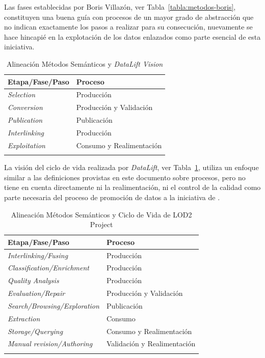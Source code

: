 Las fases establecidas por Boris Villazón, ver Tabla~\ref{tabla:metodos-boris}, constituyen una buena guía con procesos
de un mayor grado de abstracción que no indican exactamente los pasos a realizar para su consecución, nuevamente se
hace hincapié en la explotación de los datos enlazados como parte esencial de esta iniciativa.

\begin{longtable}[c]{|p{6cm}|p{8cm}|} 

\hline

  \textbf{Etapa/Fase/Paso} &  \textbf{Proceso} \\\hline

\endhead
\textit{Selection} & Producción \\ \hline
\textit{Conversion} & Producción y Validación \\ \hline
\textit{Publication} & Publicación \\ \hline
\textit{Interlinking} & Producción \\ \hline
\textit{Exploitation} & Consumo y Realimentación \\ \hline
\hline
\caption{Alineación Métodos Semánticos y \textit{DataLift Vision}}  \label{tabla:metodos-data-lift}\\    
\end{longtable}

La visión del ciclo de vida realizada por \textit{DataLift}, ver Tabla~\ref{tabla:metodos-data-lift}, utiliza
un enfoque similar a las definiciones provistas en este documento sobre procesos, pero no tiene en cuenta directamente ni la realimentación, ni el control
de la calidad como parte necesaria del proceso de promoción de datos a la iniciativa de \linkeddata.

\begin{longtable}[c]{|p{6cm}|p{8cm}|} 

\hline
  \textbf{Etapa/Fase/Paso} &  \textbf{Proceso} \\\hline

\endhead
\textit{Interlinking/Fusing} & Producción \\ \hline
\textit{Classification/Enrichment} & Producción \\ \hline
\textit{Quality Analysis} & Producción \\ \hline
\textit{Evaluation/Repair} & Producción y Validación \\ \hline
\textit{Search/Browsing/Exploration} & Publicación \\ \hline
\textit{Extraction} & Consumo \\ \hline
\textit{Storage/Querying} & Consumo y Realimentación \\ \hline
\textit{Manual revision/Authoring} & Validación y Realimentación \\ \hline
\hline
\caption{Alineación Métodos Semánticos y Ciclo de Vida de LOD2 Project}  \label{tabla:metodos-lod2}\\    
\end{longtable}

